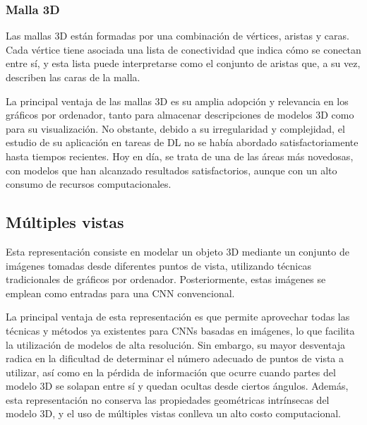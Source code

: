 \subsubsection{Malla 3D}
Las mallas 3D están formadas por una combinación de vértices, aristas y caras. Cada vértice tiene asociada una lista de conectividad que indica cómo se conectan entre sí, y esta lista puede interpretarse como el conjunto de aristas que, a su vez, describen las caras de la malla.

La principal ventaja de las mallas 3D es su amplia adopción y relevancia en los gráficos por ordenador, tanto para almacenar descripciones de modelos 3D como para su visualización. No obstante, debido a su irregularidad y complejidad, el estudio de su aplicación en tareas de DL no se había abordado satisfactoriamente hasta tiempos recientes. Hoy en día, se trata de una de las áreas más novedosas, con modelos que han alcanzado resultados satisfactorios, aunque con un alto consumo de recursos computacionales.

\subsection{Múltiples vistas}
Esta representación consiste en modelar un objeto 3D mediante un conjunto de imágenes tomadas desde diferentes puntos de vista, utilizando técnicas tradicionales de gráficos por ordenador. Posteriormente, estas imágenes se emplean como entradas para una CNN convencional.

La principal ventaja de esta representación es que permite aprovechar todas las técnicas y métodos ya existentes para CNNs basadas en imágenes, lo que facilita la utilización de modelos de alta resolución. Sin embargo, su mayor desventaja radica en la dificultad de determinar el número adecuado de puntos de vista a utilizar, así como en la pérdida de información que ocurre cuando partes del modelo 3D se solapan entre sí y quedan ocultas desde ciertos ángulos. Además, esta representación no conserva las propiedades geométricas intrínsecas del modelo 3D, y el uso de múltiples vistas conlleva un alto costo computacional.